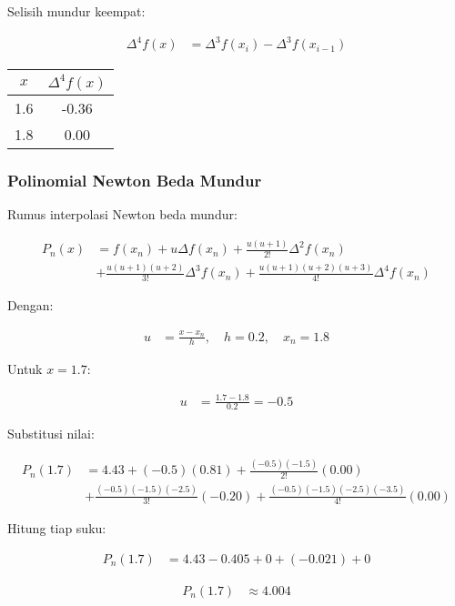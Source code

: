 \documentclass{article}
\begin{document}
Selisih mundur keempat:

\begin{align*}
    \Delta^4 f(x) &= \Delta^3 f(x_i) - \Delta^3 f(x_{i-1})
\end{align*}

\begin{center}
\begin{tabular}{|c|c|}
    \hline
    $x$ & $\Delta^4 f(x)$ \\
    \hline
    1.6 & -0.36 \\
    1.8 & 0.00 \\
    \hline
\end{tabular}
\end{center}

\subsubsection{Polinomial Newton Beda Mundur}
Rumus interpolasi Newton beda mundur:

\begin{align*}
    P_n(x) &= f(x_n) + u\Delta f(x_n) + \frac{u(u+1)}{2!} \Delta^2 f(x_n) \\
    &+ \frac{u(u+1)(u+2)}{3!} \Delta^3 f(x_n) + \frac{u(u+1)(u+2)(u+3)}{4!} \Delta^4 f(x_n)
\end{align*}

Dengan:

\begin{align*}
    u &= \frac{x - x_n}{h}, \quad h = 0.2, \quad x_n = 1.8
\end{align*}

Untuk $x = 1.7$:

\begin{align*}
    u &= \frac{1.7 - 1.8}{0.2} = -0.5
\end{align*}

Substitusi nilai:

\begin{align*}
    P_n(1.7) &= 4.43 + (-0.5)(0.81) + \frac{(-0.5)(-1.5)}{2!} (0.00) \\
    &+ \frac{(-0.5)(-1.5)(-2.5)}{3!} (-0.20) + \frac{(-0.5)(-1.5)(-2.5)(-3.5)}{4!} (0.00)
\end{align*}

Hitung tiap suku:

\begin{align*}
    P_n(1.7) &= 4.43 - 0.405 + 0 + (-0.021) + 0
\end{align*}

\begin{align*}
    P_n(1.7) &\approx 4.004
\end{align*}
\end{document}
